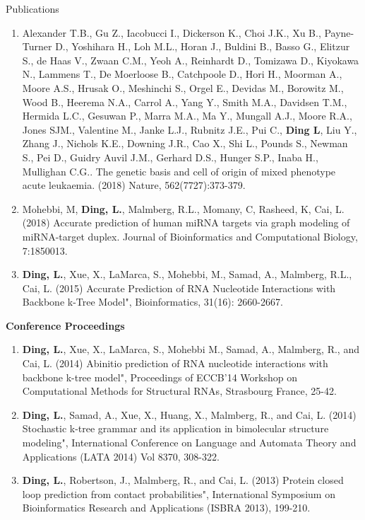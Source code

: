 \documentclass{resume} %
\begin{document}
\begin{rSection}{Publications}
\begin{enumerate}
\item Alexander T.B., Gu Z., Iacobucci I., Dickerson K., Choi J.K., Xu B., Payne-Turner D., Yoshihara H., Loh M.L., Horan J., Buldini B., Basso G., Elitzur S., de Haas V., Zwaan C.M., Yeoh A., Reinhardt D., Tomizawa D., Kiyokawa N., Lammens T., De Moerloose B., Catchpoole D., Hori H., Moorman A., Moore A.S., Hrusak O., Meshinchi S., Orgel E., Devidas M., Borowitz M., Wood B., Heerema N.A., Carrol A., Yang Y., Smith M.A., Davidsen T.M., Hermida L.C., Gesuwan P., Marra M.A., Ma Y., Mungall A.J., Moore R.A., Jones SJM., Valentine M., Janke L.J., Rubnitz J.E., Pui C., \textbf{Ding L}, Liu Y., Zhang J., Nichols K.E., Downing J.R., Cao X., Shi L., Pounds S., Newman S., Pei D., Guidry Auvil J.M., Gerhard D.S., Hunger S.P., Inaba H., Mullighan C.G.. The genetic basis and cell of origin of mixed phenotype acute leukaemia. (2018) Nature, 562(7727):373-379.

\item Mohebbi, M, \textbf{Ding, L.}, Malmberg, R.L., Momany, C, Rasheed, K, Cai, L. (2018)
Accurate prediction of human miRNA targets via graph modeling of miRNA-target duplex. Journal of Bioinformatics and Computational Biology, 7:1850013.

\item \textbf{Ding, L.}, Xue, X., LaMarca, S., Mohebbi, M., Samad, A., Malmberg, R.L., Cai, L. (2015) Accurate Prediction of RNA Nucleotide Interactions with Backbone k-Tree Model", Bioinformatics, 31(16): 2660-2667.
\end{enumerate}


\textbf{Conference Proceedings}
\begin{enumerate}
\item \textbf{Ding, L.}, Xue, X., LaMarca, S., Mohebbi M., Samad, A., Malmberg, R., and Cai, L. (2014) Abinitio prediction of RNA nucleotide interactions with backbone k-tree model", Proceedings of ECCB'14 Workshop on Computational Methods for Structural RNAs, Strasbourg France, 25-42.

\item \textbf{Ding, L.}, Samad, A., Xue, X., Huang, X., Malmberg, R., and Cai, L. (2014) Stochastic k-tree grammar and its application in bimolecular structure modeling", International Conference on Language and Automata Theory and Applications (LATA 2014) Vol 8370, 308-322.

\item \textbf{Ding, L.}, Robertson, J., Malmberg, R., and Cai, L. (2013) Protein closed loop prediction from contact probabilities", International Symposium on Bioinformatics Research and Applications (ISBRA 2013), 199-210.


\end{enumerate}
\end{rSection}
\end{document}
